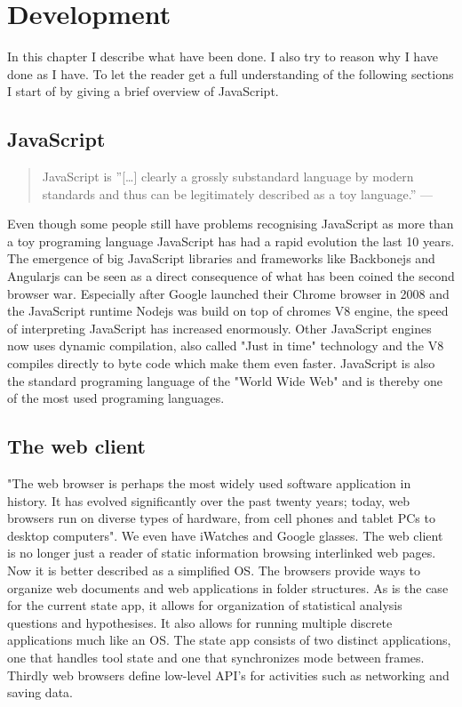 \documentclass[english]{ifimaster}
\begin{document}
\chapter{Development}
In this chapter I describe what have been done. I also try to reason why I have done as I have. To let the reader get a full understanding of the following sections I start of by giving a brief overview of JavaScript.

\section{JavaScript}

\begin{quotation}
\noindent JavaScript is ”[…] clearly a grossly substandard language by modern
standards and thus can be legitimately described as a toy language.” —
\parencite{arno}
\end{quotation}

Even though some people still have problems recognising JavaScript as more than a toy programing language JavaScript has had a rapid evolution the last 10 years. The emergence of  big JavaScript libraries and frameworks like Backbonejs and Angularjs can be seen as a direct consequence of what has been coined the second browser war\parencite{Yule2013}. Especially after Google launched their Chrome browser in 2008 and the JavaScript runtime Nodejs was build on top of chromes V8 engine, the speed of interpreting JavaScript has increased enormously. Other JavaScript engines now uses dynamic compilation, also called "Just in time" technology and the V8 compiles directly to byte code which make them even faster\parencite{anand}. JavaScript is also the standard programing language of the "World Wide Web"\parencite[p. 1]{flanagan} and is thereby one of the most used programing languages.


\section{The web client}
"The web browser is perhaps the most widely used software application in history. It has evolved significantly over the past twenty years; today, web browsers run on diverse types of hardware, from cell phones and tablet PCs to desktop computers"\parencite[p. 2]{gross}. We even have iWatches and Google glasses. The web client is no longer just a reader of static information browsing interlinked web pages. Now it is better described as a simplified OS\parencite[p.310]{flanagan}. The browsers provide ways to organize web documents and web applications in folder structures. As is the case for the current state app, it allows for organization of statistical analysis questions and hypothesises. It also allows for running multiple discrete applications much like an OS. The state app consists of two distinct applications, one that handles tool state and one that synchronizes mode between frames. Thirdly web browsers define low-level API's for activities such as networking and saving data. 
\end{document}

